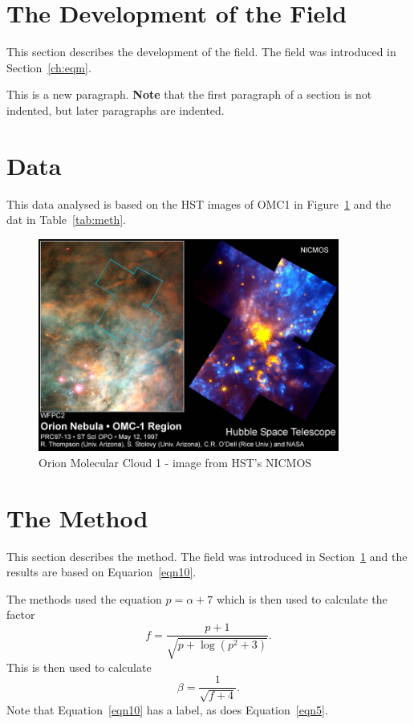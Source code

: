 \documentclass[twoside,fontsize=12pt,
     bibliography=totoc, %
     listof=totoc, %
     index=totoc, %
     onehalfspacing %
]{_MScDiss2017_cls}
\begin{document}
\section{The Development of the Field}
\label{sec_devel}
This section describes the development of the  field. The field was introduced in Section~\ref{ch:eqm}.

This is a new paragraph. {\bf Note} that the first paragraph of a 
section is not indented, but later paragraphs are indented. 

\section{Data}
\label{sec:data}
This data analysed is based on the  HST images of OMC1 in Figure~\ref{orion_pic} and the dat in Table~\ref{tab:meth}. 
\begin{figure}[hbtp]
\begin{center}
 \includegraphics[height=70mm]{fig-omc1nic}
 \caption {Orion Molecular Cloud 1 - image from HST's NICMOS}
 \label{orion_pic}
\end{center}
\end{figure}
\section{The Method}
\label{sec_method}
This section describes the method. The field was introduced in Section~\ref{sec_devel} 
and the results are based on Equarion~\ref{eqn10}. 

The methods used the equation $p = \alpha + 7$ which is then used 
to calculate the factor 
\begin{equation}
 f = \frac{p+1}{ \sqrt{ p + \log( p^2 + 3 ) } }  . 
 \label{eqn10}
\end{equation}
This is then used to calculate 
\begin{equation}
 \beta = \frac{1}{ \sqrt{ f + 4 } } .
 \label{eqn5}
\end{equation}
Note that Equation~\ref{eqn10} has a label, as does Equation~\ref{eqn5}. 
\end{document}
